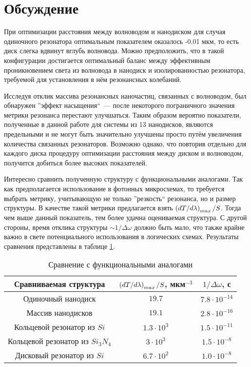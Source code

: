 \section{Обсуждение}

При оптимизации расстояния между волноводом и нанодиском для случая одиночного резонатора оптимальным показателем оказалось -0.01 мкм, то есть диск слегка вдвинут вглубь волновода. Можно предположить, что в такой конфигурации достигается оптимальный баланс между эффективным проникновением света из волновода в нанодиск и изолированностью резонатора, требуемой для установления в нём резонансных колебаний.

Исследуя отклик массива резонансных наночастиц, связанных с волноводом, был обнаружен ''эффект насыщения``~--- после некоторого пограничного значения метрики резонанса перестают улучшаться. Таким образом вероятно показатели, полученные в данной работе для системы из 13 нанодисков, являются предельными и не могут быть значительно улучшены просто путём увеличения количества связанных резонаторов. Возможно однако, что повторив отдельно для каждого диска процедуру оптимизации расстояния между диском и волноводом, получится добиться более высоких показателей.

Интересно сравнить полученную структуру с функциональными аналогами. Так как предполагается использование в фотонных микросхемах, то требуется выбрать метрику, учитывающую не только ''резкость`` резонанса, но и размер структуры. В качестве такой метрики предлагается взять $\left( dT/d\lambda \right)_{max}/S$. Тогда чем выше данный показатель, тем более удачна оцениваемая структура. С другой стороны, время отклика структуры $\sim 1/\Delta \omega$ должно быть мало, что также крайне важно в свете потенциального использования в логических схемах. Результаты сравнения представлены в таблице \ref{tbl:functional_compare}.

\begin{table}[H]
	\centering
	\begin{tabular}{|c|c|c|}
		\hline
		Сравниваемая структура & $\left( dT/d\lambda \right)_{max}/S$, мкм$^{-3}$ & $1/\Delta \omega$, с \\
		\hline
		Одиночный нанодиск & $19.7$ & $7.8 \cdot 10^{-14}$\\
		\hline
		Массив нанодисков & $19.1$ & $2.8 \cdot 10^{-16}$\\
		\hline
		Кольцевой резонатор из $Si$ \cite{Vilson2004} & $1.3 \cdot 10^3$ & $1.5 \cdot 10^{-11}$\\
		\hline
		Кольцевой резонатор из $Si_3 N_4$ \cite{Gondarenko2009} & $3 \cdot 10^3$ & $1.5 \cdot 10^{-8}$\\
		\hline
		Дисковый резонатор из $Si$ \cite{Soltani2007} & $6.7 \cdot 10^2$ & $1.0 \cdot 10^{-8}$\\
		\hline
	\end{tabular}
	\caption{Сравнение с функциональными аналогами}
	\label{tbl:functional_compare}
\end{table}


